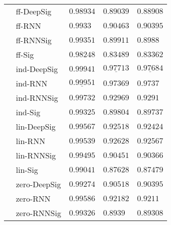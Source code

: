 \begin{tabular}{lllll}
       & ff-DeepSig &                           $ 0.98934 $ &                           $ 0.89039 $ &                           $ 0.88908 $ \\
       & ff-RNN &                            $ 0.9933 $ &                           $ 0.90463 $ &                           $ 0.90395 $ \\
       & ff-RNNSig &                           $ 0.99351 $ &                           $ 0.89911 $ &                            $ 0.8988 $ \\
       & ff-Sig &                           $ 0.98248 $ &                           $ 0.83489 $ &                           $ 0.83362 $ \\
       & ind-DeepSig &               $  \mathbf{ 0.99941 } $ &  $  \mathbf{ \underline{ 0.97713 }} $ &  $  \mathbf{ \underline{ 0.97684 }} $ \\
       & ind-RNN &  $  \mathbf{ \underline{ 0.99951 }} $ &               $  \mathbf{ 0.97369 } $ &                $  \mathbf{ 0.9737 } $ \\
       & ind-RNNSig &                           $ 0.99732 $ &                           $ 0.92969 $ &                            $ 0.9291 $ \\
       & ind-Sig &                           $ 0.99325 $ &                           $ 0.89804 $ &                           $ 0.89737 $ \\
       & lin-DeepSig &                           $ 0.99567 $ &                           $ 0.92518 $ &                           $ 0.92424 $ \\
       & lin-RNN &                           $ 0.99539 $ &                           $ 0.92628 $ &                           $ 0.92567 $ \\
       & lin-RNNSig &                           $ 0.99495 $ &                           $ 0.90451 $ &                           $ 0.90366 $ \\
       & lin-Sig &                           $ 0.99041 $ &                           $ 0.87628 $ &                           $ 0.87479 $ \\
       & zero-DeepSig &                           $ 0.99274 $ &                           $ 0.90518 $ &                           $ 0.90395 $ \\
       & zero-RNN &                           $ 0.99586 $ &                           $ 0.92182 $ &                            $ 0.9211 $ \\
       & zero-RNNSig &                           $ 0.99326 $ &                            $ 0.8939 $ &                           $ 0.89308 $ \\

\end{tabular}
